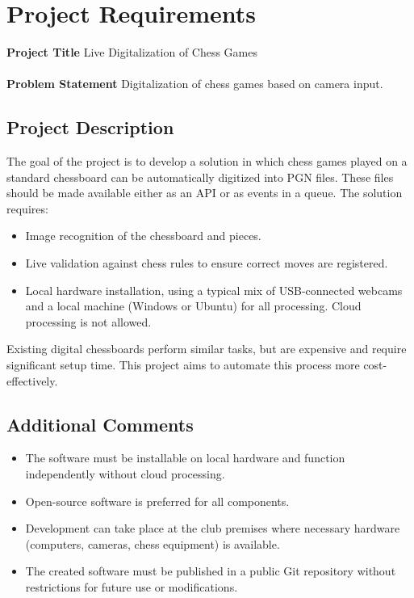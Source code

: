 \chapter*{Project Requirements}
\textbf{Project Title} Live Digitalization of Chess Games\\\\
\textbf{Problem Statement} Digitalization of chess games based on camera input.

\section*{Project Description}
The goal of the project is to develop a solution in which chess games played on a standard chessboard can be automatically digitized into PGN files. These files should be made available either as an API or as events in a queue. The solution requires:
\begin{itemize}
    \item Image recognition of the chessboard and pieces.
    \item Live validation against chess rules to ensure correct moves are registered.
    \item Local hardware installation, using a typical mix of USB-connected webcams and a local machine (Windows or Ubuntu) for all processing. Cloud processing is not allowed.
\end{itemize}

Existing digital chessboards perform similar tasks, but are expensive and require significant setup time. This project aims to automate this process more cost-effectively.

\section*{Additional Comments}
\begin{itemize}
    \item The software must be installable on local hardware and function independently without cloud processing.
    \item Open-source software is preferred for all components.
    \item Development can take place at the club premises where necessary hardware (computers, cameras, chess equipment) is available.
    \item The created software must be published in a public Git repository without restrictions for future use or modifications.
\end{itemize}